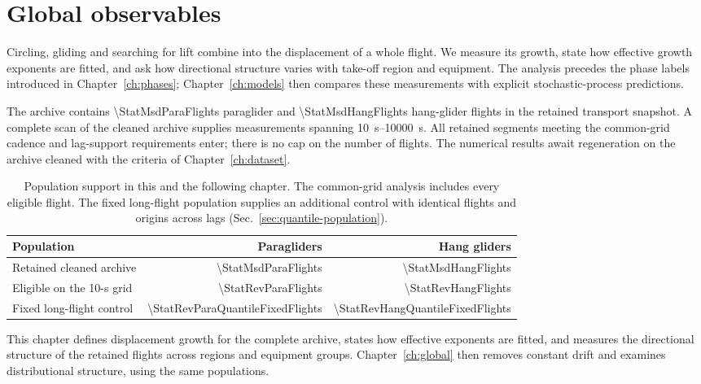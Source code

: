 \chapter{Global observables}
\label{ch:observables}

Circling, gliding and searching for lift combine into the displacement of a whole
flight. We measure its growth, state how effective growth exponents are fitted, and ask
how directional structure varies with take-off region and equipment. The analysis
precedes the phase labels introduced in Chapter~\ref{ch:phases}; Chapter~\ref{ch:models}
then compares these measurements with explicit stochastic-process predictions.

The archive contains \num{\StatMsdParaFlights} paraglider and
\num{\StatMsdHangFlights} hang-glider flights in the retained transport snapshot. A
complete scan of the cleaned archive supplies measurements spanning
\SIrange{10}{10000}{\second}. All retained segments meeting the common-grid cadence and
lag-support requirements enter; there is no cap on the number of flights.
\ifnum{}
The numerical results await regeneration on the archive cleaned with the criteria
of Chapter~\ref{ch:dataset}.
\fi

\begin{table}[htbp]
\centering\small
\caption{Population support in this and the following chapter. The common-grid
analysis includes every eligible flight. The fixed long-flight population supplies
an additional control with identical flights and origins across lags
(Sec.~\ref{sec:quantile-population}).}
\label{tab:chapter3-populations}
\begin{tabular}{@{}lrr@{}}
\toprule
\textbf{Population} & \textbf{Paragliders} & \textbf{Hang gliders}\\
\midrule
Retained cleaned archive & \num{\StatMsdParaFlights} & \num{\StatMsdHangFlights}\\
Eligible on the 10-s grid & \num{\StatRevParaFlights} & \num{\StatRevHangFlights}\\
Fixed long-flight control & \num{\StatRevParaQuantileFixedFlights} & \num{\StatRevHangQuantileFixedFlights}\\
\bottomrule
\end{tabular}
\end{table}

This chapter defines displacement growth for the complete archive, states how effective
exponents are fitted, and measures the directional structure of the retained flights
across regions and equipment groups. Chapter~\ref{ch:global} then removes constant drift
and examines distributional structure, using the same populations.

